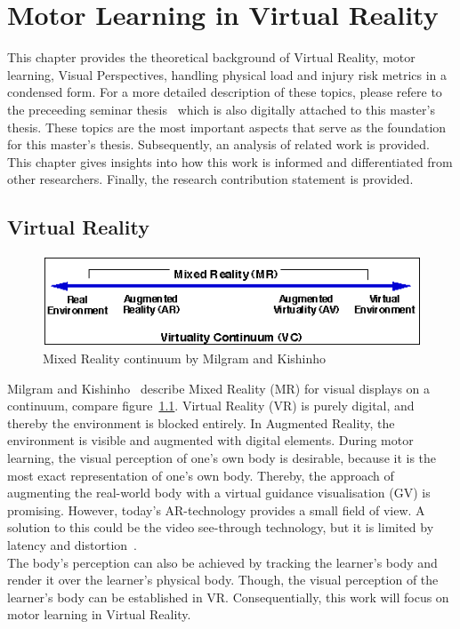 \chapter{Motor Learning in Virtual Reality}
\label{chapter:theoretical_background}
This chapter provides the theoretical background of Virtual Reality, motor learning, Visual Perspectives, handling physical load and injury risk metrics in a condensed form. For a more detailed description of these topics, please refere to the preceeding seminar thesis~\cite{seminarThesis} which is also digitally attached to this master's thesis. These topics are the most important aspects that serve as the foundation for this master's thesis. Subsequently, an analysis of related work is provided. This chapter gives insights into how this work is informed and differentiated from other researchers. Finally, the research contribution statement is provided.

\section{Virtual Reality}
\label{section:mixed_reality}
\begin{figure}[H]
	\centering
	\includegraphics[width=\textwidth]{figures/milgram_continuum.png}
	\caption[Mixed Reality continuum by Milgram et al.]{Mixed Reality continuum by Milgram and Kishinho~\cite{mrcontinuum}}
	\label{fig:mrCont}
\end{figure}
Milgram and Kishinho~\cite{mrcontinuum} describe Mixed Reality (MR) for visual displays on a continuum, compare figure~\ref{fig:mrCont}. Virtual Reality (VR) is purely digital, and thereby the environment is blocked entirely. In Augmented Reality, the environment is visible and augmented with digital elements. During motor learning, the visual perception of one's own body is desirable, because it is the most exact representation of one's own body. Thereby, the approach of augmenting the real-world body with a virtual guidance visualisation (GV) is promising. However, today's AR-technology provides a small field of view. A solution to this could be the video see-through technology, but it is limited by latency and distortion~\cite{max}.\\
The body's perception can also be achieved by tracking the learner's body and render it over the learner's physical body. Though, the visual perception of the learner's body can be established in VR. Consequentially, this work will focus on motor learning in Virtual Reality.

